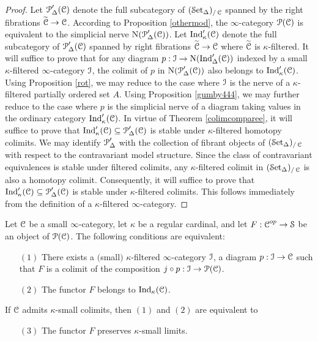 \begin{proof}
Let $\operatorname{\mathcal{P}}'_{\Delta}(\operatorname{\mathcal{C}})$ denote the full subcategory of $(\operatorname{\mathcal{S}et_{\Delta}})_{/\operatorname{\mathcal{C}}}$ spanned
by the right fibrations $\widetilde{\operatorname{\mathcal{C}}} \rightarrow \operatorname{\mathcal{C}}$. According to Proposition \ref{othermod},
the $\infty$-category $\operatorname{\mathcal{P}}(\operatorname{\mathcal{C}})$ is equivalent to the simplicial nerve $\operatorname{N} (\operatorname{\mathcal{P}}'_{\Delta}(\operatorname{\mathcal{C}}))$. Let $\operatorname{Ind}'_{\kappa}(\operatorname{\mathcal{C}})$ denote the full subcategory of
$\operatorname{\mathcal{P}}'_{\Delta}(\operatorname{\mathcal{C}})$ spanned by right fibrations $\widetilde{\operatorname{\mathcal{C}}} \rightarrow \operatorname{\mathcal{C}}$ where
$\widetilde{\operatorname{\mathcal{C}}}$ is $\kappa$-filtered. It will suffice to prove that for any diagram
$p: \operatorname{\mathcal{I}} \rightarrow \operatorname{N}(\operatorname{Ind}'_{\Delta}(\operatorname{\mathcal{C}}))$ indexed by a small $\kappa$-filtered $\infty$-category $\operatorname{\mathcal{I}}$, the colimit of $p$ in $\operatorname{N}(\operatorname{\mathcal{P}}'_{\Delta}(\operatorname{\mathcal{C}}))$ also belongs to
$\operatorname{Ind}'_{\kappa}(\operatorname{\mathcal{C}})$. Using Proposition \ref{rot}, we may reduce to the case where $\operatorname{\mathcal{I}}$ is the nerve of a $\kappa$-filtered partially ordered set $A$. Using Proposition \ref{gumby444}, we may further reduce to the case where $p$ is the simplicial nerve of a diagram taking values in the ordinary category $\operatorname{Ind}'_{\kappa}(\operatorname{\mathcal{C}})$. In virtue of Theorem \ref{colimcomparee}, it will suffice to prove that $\operatorname{Ind}'_{\kappa}(\operatorname{\mathcal{C}}) \subseteq \operatorname{\mathcal{P}}'_{\Delta}(\operatorname{\mathcal{C}})$ is stable under $\kappa$-filtered homotopy colimits. We may identify $\operatorname{\mathcal{P}}'_{\Delta}$ with the collection of fibrant objects of
$(\operatorname{\mathcal{S}et_{\Delta}})_{/\operatorname{\mathcal{C}}}$ with respect to the contravariant model structure. Since the class of contravariant equivalences is stable under filtered colimits, any $\kappa$-filtered colimit in
$(\operatorname{\mathcal{S}et_{\Delta}})_{/\operatorname{\mathcal{C}}}$ is also a homotopy colimit. Consequently, it will suffice to prove that
$\operatorname{Ind}'_{\kappa}(\operatorname{\mathcal{C}}) \subseteq \operatorname{\mathcal{P}}'_{\Delta}(\operatorname{\mathcal{C}})$ is stable under $\kappa$-filtered colimits.
This follows immediately from the definition of a $\kappa$-filtered $\infty$-category.
\end{proof}

\begin{corollary}\label{indpr}
Let $\operatorname{\mathcal{C}}$ be a small $\infty$-category, let $\kappa$ be a regular cardinal, and let
$F: \operatorname{\mathcal{C}}^{op} \rightarrow \operatorname{\mathcal{S}}$ be an object of $\operatorname{\mathcal{P}}(\operatorname{\mathcal{C}})$. The following conditions are equivalent:

\begin{itemize}
\item[$(1)$] There exists a $($small$)$ $\kappa$-filtered $\infty$-category $\operatorname{\mathcal{I}}$, a diagram
$p: \operatorname{\mathcal{I}} \rightarrow \operatorname{\mathcal{C}}$ such that $F$ is a colimit of the composition
$j \circ p: \operatorname{\mathcal{I}} \rightarrow \operatorname{\mathcal{P}}(\operatorname{\mathcal{C}})$.

\item[$(2)$] The functor $F$ belongs to $\operatorname{Ind}_{\kappa}(\operatorname{\mathcal{C}})$.

\end{itemize}

If $\operatorname{\mathcal{C}}$ admits $\kappa$-small colimits, then $(1)$ and $(2)$ are equivalent to
\begin{itemize}

\item[$(3)$] The functor $F$ preserves $\kappa$-small limits.
\end{itemize}
\end{corollary}

